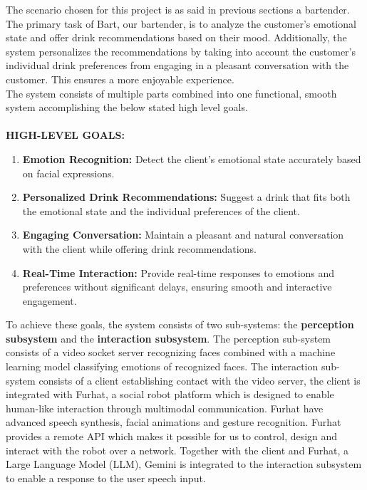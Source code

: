 \documentclass[conference]{IEEEtran}
\begin{document}
The scenario chosen for this project is as said in previous sections a bartender. The primary task of Bart, our bartender, is to analyze the customer's emotional state and offer drink recommendations based on their mood. Additionally, the system personalizes the recommendations by taking into account the customer's individual drink preferences from engaging in a pleasant conversation with the customer. This ensures a more enjoyable experience.\\The system consists of multiple parts combined into one functional, smooth system accomplishing the below stated high level goals.\\
\\
\textbf{HIGH-LEVEL GOALS:}
\\
\begin{enumerate}
    \item \textbf{Emotion Recognition:} Detect the client’s emotional state accurately based on facial expressions.
    \item \textbf{Personalized Drink Recommendations:} Suggest a drink that fits both the emotional state and the individual preferences of the client.
    \item \textbf{Engaging Conversation:} Maintain a pleasant and natural conversation with the client while offering drink recommendations.
    \item \textbf{Real-Time Interaction:} Provide real-time responses to emotions and preferences without significant delays, ensuring smooth and interactive engagement.\\
\end{enumerate}
To achieve these goals, the system consists of two sub-systems: the \textbf{perception subsystem} and the \textbf{interaction subsystem}. The perception sub-system consists of a video socket server recognizing faces combined with a machine learning model classifying emotions of recognized faces. The interaction sub-system consists of a client establishing contact with the video server, the client is integrated with Furhat, a social robot platform which is designed to enable human-like interaction through multimodal communication. Furhat have advanced speech synthesis, facial animations and gesture recognition. Furhat provides a remote API which makes it possible for us to control, design and interact with the robot over a network. Together with the client and Furhat, a Large Language Model (LLM), Gemini is integrated to the interaction subsystem to enable a response to the user speech input.\\
\end{document}
